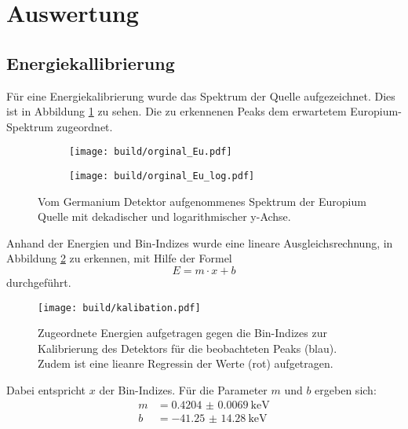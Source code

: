 \newpage
\section{Auswertung}
\label{sec:Auswertung}

\subsection{Energiekallibrierung}
\label{sec:Energiekallibrierung}
Für eine Energiekalibrierung wurde das Spektrum der  Quelle
aufgezeichnet. Dies ist in Abbildung \ref{plt:Eu-Spektrum} zu sehen. Die zu
erkennenen Peaks dem erwartetem Europium-Spektrum zugeordnet.

\begin{figure}[htb]
  \begin{subfigure}{0.5\textwidth}
    \centering
    \texttt{[image: build/orginal\_Eu.pdf]}
  \end{subfigure}
  \begin{subfigure}{0.5\textwidth}
    \centering
    \texttt{[image: build/orginal\_Eu\_log.pdf]}
  \end{subfigure}
  \caption{Vom Germanium Detektor aufgenommenes Spektrum der Europium Quelle mit
  dekadischer und logarithmischer y-Achse.}
  \label{plt:Eu-Spektrum}
\end{figure}

Anhand der Energien und Bin-Indizes wurde eine lineare Ausgleichsrechnung, in
Abbildung \ref{plt:eichung} zu erkennen, mit Hilfe der Formel
\begin{equation}
  E = m \cdot x + b
\end{equation}
durchgeführt.

\begin{figure}[htb]
  \centering
  \texttt{[image: build/kalibation.pdf]}
  \caption{Zugeordnete Energien aufgetragen gegen die Bin-Indizes zur
  Kalibrierung des Detektors für die beobachteten Peaks (blau). Zudem ist eine
  lieanre Regressin der Werte (rot) aufgetragen.}
  \label{plt:eichung}
\end{figure}

Dabei entspricht $x$ der Bin-Indizes. Für die Parameter $m$ und
$b$ ergeben sich:
\begin{align}
  m &= \SI{0.4204(69)}{\kilo\electronvolt} \\
  b &= \SI{-41.25(1428)}{\kilo\electronvolt}
\end{align}


\FloatBarrier

